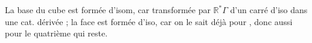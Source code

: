 
La base du cube est formée d'isom, car transformée par $\mathbb R^*\Gamma$ d'un carré d'iso dans une cat. dérivée ; la face  est formée d'iso, car on le sait déjà pour , donc aussi pour le quatrième qui reste.

